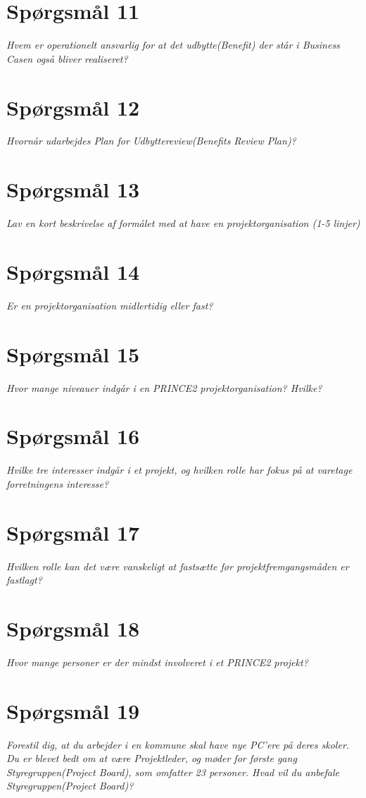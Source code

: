 \section{Spørgsmål 11}
\textit{Hvem er operationelt ansvarlig for at det udbytte(Benefit) der står i Business Casen også bliver realiseret?}
\section{Spørgsmål 12}
\textit{Hvornår udarbejdes Plan for Udbyttereview(Benefits Review Plan)?}
\section{Spørgsmål 13}
\textit{Lav en kort beskrivelse af formålet med at have en projektorganisation (1-5 linjer)}
\section{Spørgsmål 14}
\textit{Er en projektorganisation midlertidig eller fast?}
\section{Spørgsmål 15}
\textit{Hvor mange niveauer indgår i en PRINCE2 projektorganisation? Hvilke?}
\section{Spørgsmål 16}
\textit{Hvilke tre interesser indgår i et projekt, og hvilken rolle har fokus på at varetage forretningens interesse?}
\section{Spørgsmål 17}
\textit{Hvilken rolle kan det være vanskeligt at fastsætte før projektfremgangsmåden er fastlagt?}
\section{Spørgsmål 18}
\textit{Hvor mange personer er der mindst involveret i et PRINCE2 projekt?}
\section{Spørgsmål 19}
\textit{Forestil dig, at du arbejder i en kommune skal have nye PC’ere på deres skoler. Du er blevet bedt om at være Projektleder, og møder for første gang Styregruppen(Project Board), som omfatter 23 personer. Hvad vil du anbefale Styregruppen(Project Board)?}
